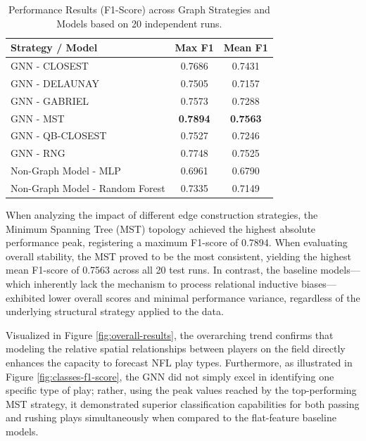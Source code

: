\documentclass[runningheads]{llncs}
\begin{document}
\begin{table}[h!]
    \centering
    \caption{Performance Results (F1-Score) across Graph Strategies and Models based on 20 independent runs.}
    \label{tab:f1_score_results}
    \begin{tabular}{l cc}
        \toprule
        \textbf{Strategy / Model} & \textbf{Max F1} & \textbf{Mean F1} \\
        \midrule
        GNN - CLOSEST      & 0.7686 & 0.7431 \\
        GNN - DELAUNAY     & 0.7505 & 0.7157 \\
        GNN - GABRIEL      & 0.7573 & 0.7288 \\
        GNN - MST          & \textbf{0.7894} & \textbf{0.7563} \\
        GNN - QB-CLOSEST   & 0.7527 & 0.7246 \\
        GNN - RNG          & 0.7748 & 0.7525 \\
        \midrule
        Non-Graph Model - MLP            & 0.6961 & 0.6790 \\
        Non-Graph Model - Random Forest  & 0.7335 & 0.7149 \\
        \bottomrule
    \end{tabular}
\end{table}

When analyzing the impact of different edge construction strategies, the Minimum Spanning Tree (MST) topology achieved the highest absolute performance peak, registering a maximum F1-score of 0.7894. When evaluating overall stability, the MST proved to be the most consistent, yielding the highest mean F1-score of 0.7563 across all 20 test runs. In contrast, the baseline models—which inherently lack the mechanism to process relational inductive biases—exhibited lower overall scores and minimal performance variance, regardless of the underlying structural strategy applied to the data.

Visualized in Figure \ref{fig:overall-results}, the overarching trend confirms that modeling the relative spatial relationships between players on the field directly enhances the capacity to forecast NFL play types. Furthermore, as illustrated in Figure \ref{fig:classes-f1-score}, the GNN did not simply excel in identifying one specific type of play; rather, using the peak values reached by the top-performing MST strategy, it demonstrated superior classification capabilities for both passing and rushing plays simultaneously when compared to the flat-feature baseline models. 
\end{document}

